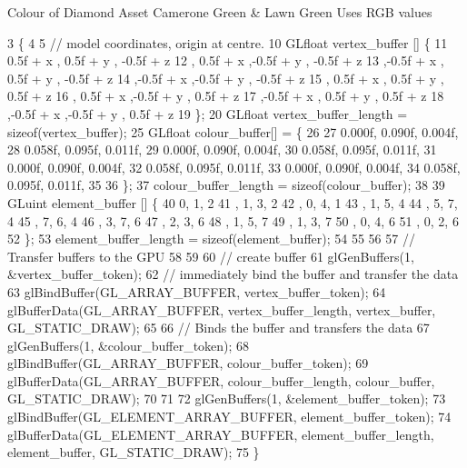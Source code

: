 Colour of Diamond Asset Camerone Green \& Lawn Green Uses R\+G\+B values
\begin{DoxyCode}
3                                                         \{
4 
5   \textcolor{comment}{// model coordinates, origin at centre.}
10 \textcolor{comment}{}  GLfloat vertex\_buffer [] \{
11       0.5f + x  , 0.5f + y  , -0.5f + z
12     , 0.5f + x  ,-0.5f + y  , -0.5f + z
13     ,-0.5f + x  , 0.5f + y  , -0.5f + z
14     ,-0.5f + x  ,-0.5f + y  , -0.5f + z
15     , 0.5f + x  , 0.5f + y  ,  0.5f + z
16     , 0.5f + x  ,-0.5f + y  ,  0.5f + z
17     ,-0.5f + x  , 0.5f + y  ,  0.5f + z
18     ,-0.5f + x  ,-0.5f + y  ,  0.5f + z
19   \};
20   GLfloat vertex\_buffer\_length = \textcolor{keyword}{sizeof}(vertex\_buffer);
25   GLfloat colour\_buffer[] = \{
26 
27      0.000f, 0.090f, 0.004f, 
28      0.058f, 0.095f, 0.011f,
29      0.000f, 0.090f, 0.004f,
30      0.058f, 0.095f, 0.011f,
31      0.000f, 0.090f, 0.004f,
32      0.058f, 0.095f, 0.011f,
33      0.000f, 0.090f, 0.004f,
34      0.058f, 0.095f, 0.011f,
35 
36   \};
37  colour\_buffer\_length = \textcolor{keyword}{sizeof}(colour\_buffer);
38   
39   GLuint element\_buffer []  \{
40       0, 1, 2   
41     , 1, 3, 2
42     , 0, 4, 1   
43     , 1, 5, 4   
44     , 5, 7, 4   
45     , 7, 6, 4   
46     , 3, 7, 6   
47     , 2, 3, 6   
48     , 1, 5, 7   
49     , 1, 3, 7   
50     , 0, 4, 6   
51     , 0, 2, 6   
52   \};
53   element\_buffer\_length = \textcolor{keyword}{sizeof}(element\_buffer);
54 
55 
56 
57   \textcolor{comment}{// Transfer buffers to the GPU}
58 
59 
60   \textcolor{comment}{// create buffer}
61   glGenBuffers(1, &vertex\_buffer\_token);
62   \textcolor{comment}{// immediately bind the buffer and transfer the data}
63   glBindBuffer(GL\_ARRAY\_BUFFER, vertex\_buffer\_token);
64   glBufferData(GL\_ARRAY\_BUFFER, vertex\_buffer\_length, vertex\_buffer, GL\_STATIC\_DRAW);
65 
66   \textcolor{comment}{// Binds the buffer and transfers the data}
67   glGenBuffers(1, &colour\_buffer\_token);
68   glBindBuffer(GL\_ARRAY\_BUFFER, colour\_buffer\_token);
69   glBufferData(GL\_ARRAY\_BUFFER, colour\_buffer\_length, colour\_buffer, GL\_STATIC\_DRAW);
70 
71 
72   glGenBuffers(1, &element\_buffer\_token);
73   glBindBuffer(GL\_ELEMENT\_ARRAY\_BUFFER, element\_buffer\_token);
74   glBufferData(GL\_ELEMENT\_ARRAY\_BUFFER, element\_buffer\_length, element\_buffer, GL\_STATIC\_DRAW);
75 \}
\end{DoxyCode}
\hypertarget{classLeavesAsset_ae98d43a307f4c75cc8a661f0b36a213a}{}
